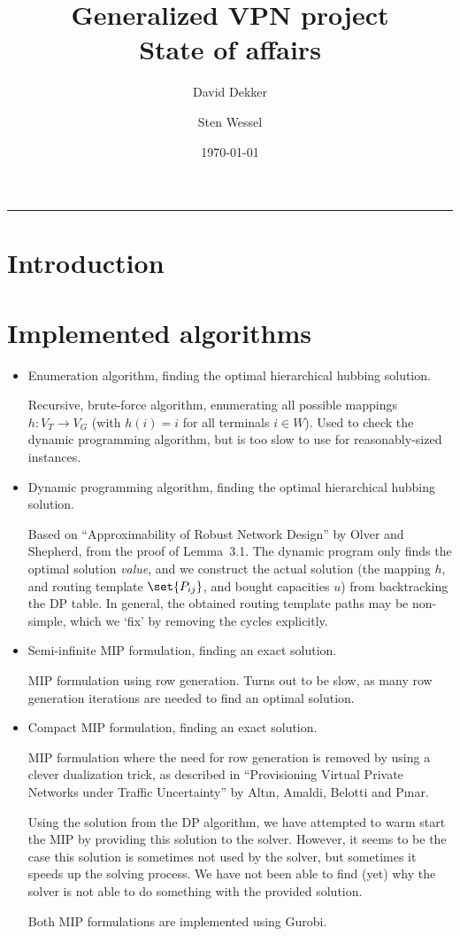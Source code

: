 \documentclass[11pt]{article}
\title{\textbf{Generalized VPN project}\\State of affairs}
\author{David Dekker \and Sten Wessel}
\date{\today}
\begin{document}
    \maketitle
    \hrule


    \section{Introduction}


    \section{Implemented algorithms}
    \begin{itemize}
        \item Enumeration algorithm, finding the optimal hierarchical hubbing solution.

        Recursive, brute-force algorithm, enumerating all possible mappings $h\colon V_T \to V_G$ (with $h(i) = i$ for all terminals $i \in W$).
        Used to check the dynamic programming algorithm, but is too slow to use for reasonably-sized instances.

        \item Dynamic programming algorithm, finding the optimal hierarchical hubbing solution.

        Based on ``Approximability of Robust Network Design'' by Olver and Shepherd, from the proof of Lemma~3.1.
        The dynamic program only finds the optimal solution \emph{value}, and we construct the actual solution (the mapping $h$, and routing template $\set{P_{ij}}$, and bought capacities $u$) from backtracking the DP table.
        In general, the obtained routing template paths may be non-simple, which we `fix' by removing the cycles explicitly.

        \item Semi-infinite MIP formulation, finding an exact solution.

        MIP formulation using row generation.
        Turns out to be slow, as many row generation iterations are needed to find an optimal solution.

        \item Compact MIP formulation, finding an exact solution.

        MIP formulation where the need for row generation is removed by using a clever dualization trick, as described in ``Provisioning Virtual Private Networks under Traffic Uncertainty'' by Alt\i{}n, Amaldi, Belotti and P\i{}nar.

        Using the solution from the DP algorithm, we have attempted to warm start the MIP by providing this solution to the solver.
        However, it seems to be the case this solution is sometimes not used by the solver, but sometimes it speeds up the solving process.
        We have not been able to find (yet) why the solver is not able to do something with the provided solution.

        Both MIP formulations are implemented using Gurobi.
    \end{itemize}
\end{document}
